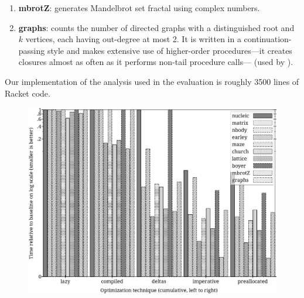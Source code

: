 \documentclass[preprint,onecolumn,9pt]{sigplanconf} %
\begin{document}
\begin{enumerate}
\item {\bf mbrotZ}: generates Mandelbrot set fractal using complex
  numbers.

\item {\bf graphs}: counts the number of directed graphs with a
  distinguished root and \(k\) vertices, each having out-degree at
  most 2. It is written in a continuation-passing style and makes
  extensive use of higher-order procedures---it creates closures
  almost as often as it performs non-tail procedure calls--- (used by
  \cite{dvanhorn:wright-jagannathan-toplas98,dvanhorn:jagannathan-etal-popl98}).
\end{enumerate}

Our implementation of the analysis used in the evaluation is roughly
3500 lines of Racket code.

\begin{figure}
\begin{center}
\includegraphics[width=6in]{rel-time.ps}
\end{center}
\end{figure}
\end{document}
